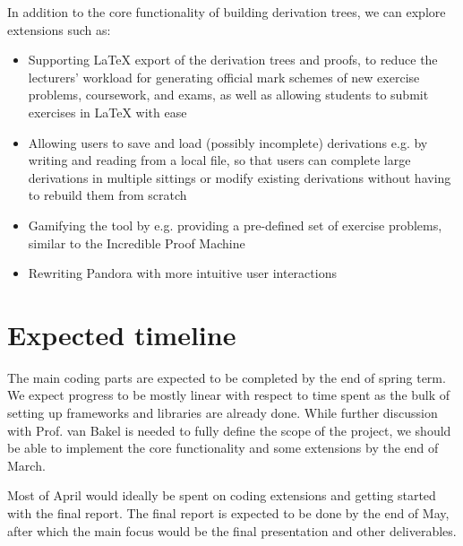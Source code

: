 In addition to the core functionality of building derivation trees, we can explore extensions such as:
\begin{itemize}
    \item Supporting \LaTeX{} export of the derivation trees and proofs, to reduce the lecturers' workload for generating official mark schemes of new exercise problems, coursework, and exams, as well as allowing students to submit exercises in \LaTeX{} with ease
    \item Allowing users to save and load (possibly incomplete) derivations e.g. by writing and reading from a local file, so that users can complete large derivations in multiple sittings or modify existing derivations without having to rebuild them from scratch
    \item Gamifying the tool by e.g. providing a pre-defined set of exercise problems, similar to the Incredible Proof Machine \cite{incredibleproofmachine, breitner:2016}
    \item Rewriting Pandora with more intuitive user interactions
\end{itemize}

\section{Expected timeline}
The main coding parts are expected to be completed by the end of spring term. We expect progress to be mostly linear with respect to time spent as the bulk of setting up frameworks and libraries are already done. While further discussion with Prof. van Bakel is needed to fully define the scope of the project, we should be able to implement the core functionality and some extensions by the end of March.

Most of April would ideally be spent on coding extensions and getting started with the final report. The final report is expected to be done by the end of May, after which the main focus would be the final presentation and other deliverables.
